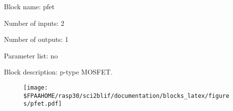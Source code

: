 \pagebreak
Block name: pfet

Number of inputs: 2

Number of outputs: 1

Parameter list: no

Block description: 
p-type MOSFET.

\begin{figure}[H]  %
\texttt{[image: \$FPAAHOME/rasp30/sci2blif/documentation/blocks\_latex/figures/pfet.pdf]}
\end{figure}

